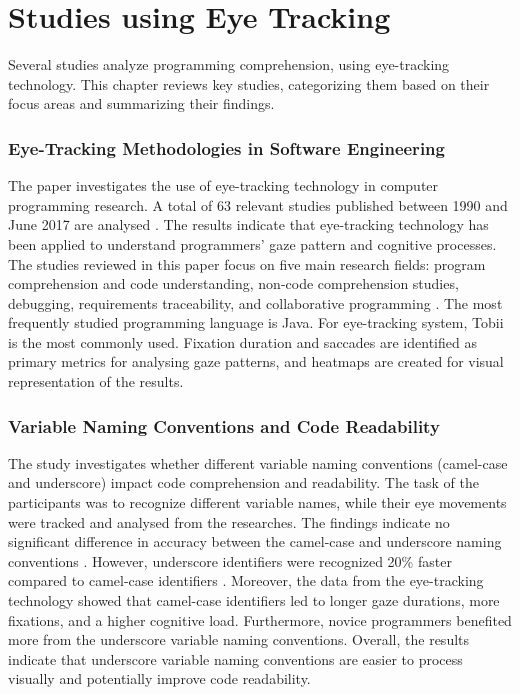 \section{Studies using Eye Tracking}

Several studies analyze programming comprehension, using eye-tracking technology. This chapter reviews key studies, categorizing them based on their focus areas and summarizing their findings.

\subsubsection{Eye-Tracking Methodologies in Software Engineering}
The paper \citet{obaidellah2018survey} investigates the use of eye-tracking technology in computer programming research. A total of 63 relevant studies published between 1990 and June 2017 are analysed \citet{obaidellah2018survey}. The results indicate that eye-tracking technology has been applied to understand programmers' gaze pattern and cognitive processes. The studies reviewed in this paper focus on five main research fields: program comprehension and code understanding, non-code comprehension studies, debugging, requirements traceability, and collaborative programming \citet{obaidellah2018survey}.  The most frequently studied programming language is Java.  
For eye-tracking system, Tobii is the most commonly used.  Fixation duration and saccades are identified as primary metrics for analysing gaze patterns, and heatmaps are created for visual representation of the results.


\subsubsection{Variable Naming Conventions and Code Readability}

The study \citet{sharif2010eye}investigates whether different variable naming conventions (camel-case and underscore) impact code comprehension and readability.
The task of the participants was to recognize different variable names, while their eye movements were tracked and analysed from the researches. 
The findings indicate no significant difference in accuracy between the camel-case and underscore naming conventions \citet{sharif2010eye}. However, underscore identifiers were recognized 20\% faster compared to camel-case identifiers \citet{sharif2010eye}. Moreover, the data from the eye-tracking technology showed that camel-case identifiers led to longer gaze durations, more fixations, and a   higher cognitive load. Furthermore, novice programmers benefited more from the underscore variable naming conventions.   
Overall, the results indicate that underscore variable naming conventions are easier to process visually and potentially improve code readability.   


